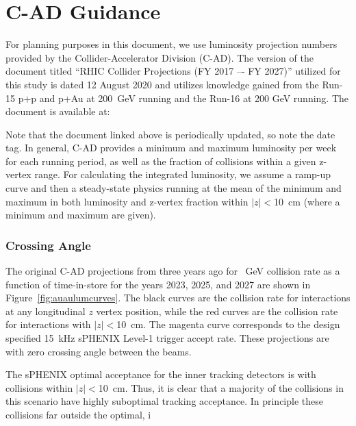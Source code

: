 \chapter{C-AD Guidance}
\label{chap:cad}

For planning purposes in this document, we use luminosity projection numbers provided by the Collider-Accelerator Division (C-AD).   The version of the document titled 
``RHIC Collider Projections (FY 2017 –- FY 2027)'' utilized for this study is dated 12 August 2020 and utilizes knowledge gained from the Run-15 p+p and p+Au at 200~GeV running and the Run-16 \auau at 200 GeV running.   The document is available at:

\bigskip
{\color{blue}{http://www.rhichome.bnl.gov/RHIC/Runs/RhicProjections.pdf}} 
\bigskip

Note that the document linked above is periodically updated, so note the date tag.  In general, C-AD provides a minimum and maximum luminosity per week for each running period, as well as the fraction of collisions within a given z-vertex range. For calculating the integrated luminosity, we assume a ramp-up curve and then a steady-state physics running at the mean of the minimum and maximum in both luminosity and z-vertex fraction within $|z|<$10~cm (where a minimum and maximum are given).  

\subsection{Crossing Angle}

The original C-AD projections from three years ago for ~GeV collision rate as a function of time-in-store for the years 2023, 2025, and 2027 are shown in Figure~\ref{fig:auaulumcurves}.    The black curves are the collision rate for interactions at any longitudinal $z$ vertex position, while the red curves are the collision rate for interactions with $|z|<$10~cm.    The magenta curve corresponds to the design specified 15~kHz sPHENIX Level-1 trigger accept rate.
These projections are with zero crossing angle between the beams.   

The sPHENIX optimal acceptance for the inner tracking detectors is with collisions within $|z|<$10~cm.   Thus, it is clear that a majority of the collisions in this scenario have highly suboptimal tracking acceptance.   In principle these collisions far outside the optimal, i



